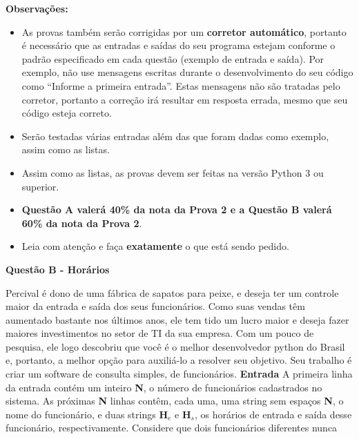 \documentclass[a4paper, 12pt]{article}
\begin{document}
\textbf{{\large Observações:}}
\begin{itemize}
	\item As provas também serão corrigidas por um \textbf{corretor automático}, portanto é necessário que as entradas e saídas do seu programa estejam conforme o padrão especificado em cada questão (exemplo de entrada e saída). Por exemplo, não use mensagens escritas durante o desenvolvimento do seu código como “Informe a primeira entrada”. Estas mensagens não são tratadas pelo corretor, portanto a correção irá resultar em resposta errada, mesmo que seu código esteja correto.
	\item Serão testadas várias entradas além das que foram dadas como exemplo, assim como as listas.
	\item Assim como as listas, as provas devem ser feitas na versão Python 3 ou superior.
	\item \textbf{Questão A valerá 40\% da nota da Prova 2 e a Questão B valerá 60\% da nota da Prova 2}.
	\item Leia com atenção e faça \textbf{exatamente} o que está sendo pedido.
\end{itemize}
\newpage %
\begin{center}
\textbf{{\Large Questão B - Horários}}
\end{center}
\vspace{5pt}
Percival é dono de uma fábrica de sapatos para peixe, e deseja ter um controle
maior da entrada e saída dos seus funcionários. Como suas vendas têm
aumentado bastante nos últimos anos, ele tem tido um lucro maior e deseja fazer
maiores investimentos no setor de TI da sua empresa. \newline
Com um pouco de pesquisa, ele logo descobriu que você é o melhor
desenvolvedor python do Brasil e, portanto, a melhor opção para auxiliá-lo a
resolver seu objetivo. \newline
Seu trabalho é criar um software de consulta simples, de funcionários. \newline \newline
\textbf{{\large Entrada}} \newline
A primeira linha da entrada contém um inteiro \textbf{N}, o número de funcionários
cadastrados no sistema. \newline
As próximas \textbf{N} linhas contêm, cada uma, uma string sem espaços \textbf{N}, o nome do
funcionário, e duas strings $\textbf{H}_e$ e $\textbf{H}_s$, os horários de entrada e saída desse
funcionário, respectivamente. Considere que dois funcionários diferentes nunca
\end{document}

